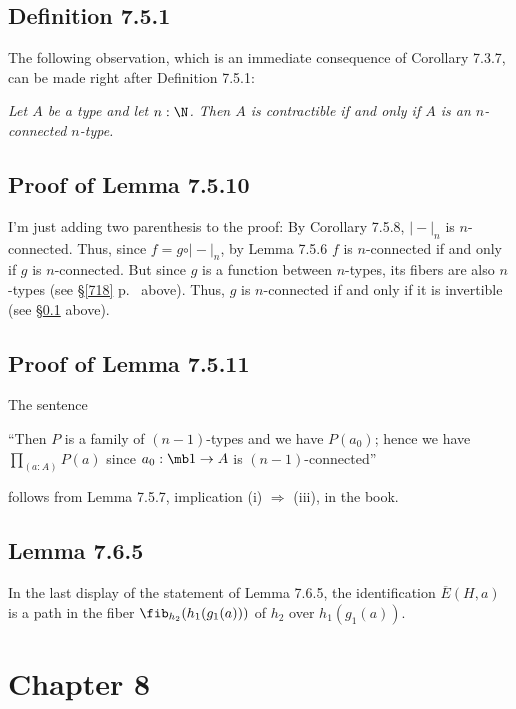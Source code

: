 \documentclass[12pt]{article}
\begin{document}

\subsection{Definition 7.5.1}\label{751}

The following observation, which is an immediate consequence of Corollary 7.3.7, can be made right after Definition 7.5.1:

\nn\emph{Let $A$ be a type and let $n:\N$. Then $A$ is contractible if and only if $A$ is an $n$-connected $n$-type.}


\subsection{Proof of Lemma 7.5.10}

I'm just adding two parenthesis to the proof: By Corollary 7.5.8, $\vert-\vert_n$ is $n$-connected. Thus, since $f=g\circ\vert-\vert_n$, by Lemma 7.5.6 $f$ is $n$-connected if and only if $g$ is $n$-connected. But since $g$ is a function between $n$-types, its fibers are also $n$-types (see \S\ref{718} p.~\pageref{718} above). Thus, $g$ is $n$-connected if and only if it is invertible (see \S\ref{751} above).


\subsection{Proof of Lemma 7.5.11}

The sentence 

\nn``Then $P$ is a family of $(n-1)$-types and we have $P(a_0)$; hence we have $\prod_{(a:A)}P(a)$ since $a_0:\mb1\to A$ is $(n-1)$-connected''

\nn follows from Lemma 7.5.7, implication (i) $\Rightarrow$ (iii), in the book.


\subsection{Lemma 7.6.5}

In the last display of the statement of Lemma 7.6.5, the identification $\overline{E}(H,a)$ is a path in the fiber $\fib_{h_2}(h_1(g_1(a)))$ of $h_2$ over $h_1(g_1(a))$.


\section{Chapter 8}
\end{document}
